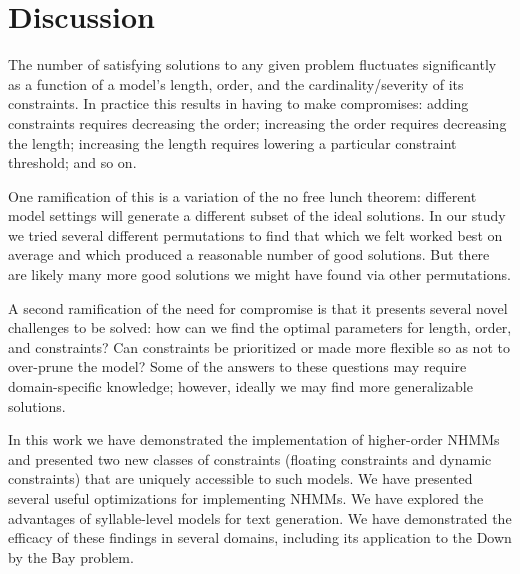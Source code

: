 \documentclass[phd,electronic,oneside,twosidetoc,letterpaper,chaptercenter,parttop,lof,lot]{byumsphd}
\begin{document}


\section{Discussion}

The number of satisfying solutions to any given problem fluctuates significantly as a function of a model's length, order, and the cardinality/severity of its constraints. In practice this results in having to make compromises: adding constraints requires decreasing the order; increasing the order requires decreasing the length; increasing the length requires lowering a particular constraint threshold; and so on.

One ramification of this is a variation of the no free lunch theorem: different model settings will generate a different subset of the ideal solutions. In our study we tried several different permutations to find that which we felt worked best on average and which produced a reasonable number of good solutions. But there are likely many more good solutions we might have found via other permutations.

A second ramification of the need for compromise is that it presents several novel challenges to be solved: how can we find the optimal parameters for length, order, and constraints? Can constraints be prioritized or made more flexible so as not to over-prune the model? Some of the answers to these questions may require domain-specific knowledge; however, ideally we may find more generalizable solutions.

In this work we have demonstrated the implementation of higher-order NHMMs and presented two new classes of constraints (floating constraints and dynamic constraints) that are uniquely accessible to such models. We have presented several useful optimizations for implementing NHMMs. We have explored the advantages of syllable-level models for text generation. We have demonstrated the efficacy of these findings in several domains, including its application to the Down by the Bay problem.
\end{document}
